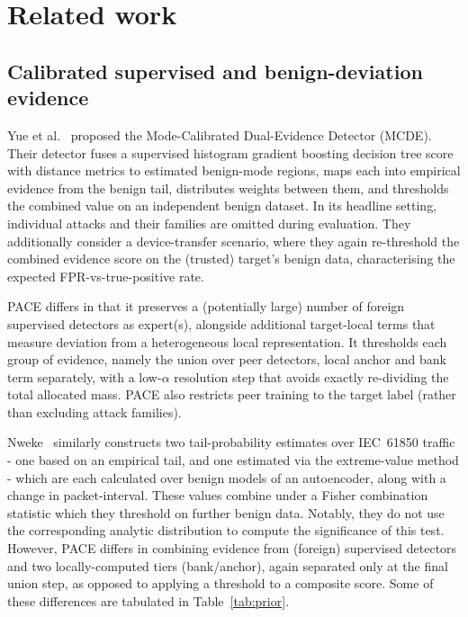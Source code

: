 \section{Related work} 
\label{sec:related} 
\subsection{Calibrated supervised and benign-deviation evidence} 
Yue et al.~\cite{yue2026mcde} proposed the Mode-Calibrated Dual-Evidence Detector (MCDE). Their detector fuses a supervised histogram gradient boosting decision tree score with distance metrics to estimated benign-mode regions, maps each into empirical evidence from the benign tail, distributes weights between them, and thresholds the combined value on an independent benign dataset. In its headline setting, individual attacks and their families are omitted during evaluation. They additionally consider a device-transfer scenario, where they again re-threshold the combined evidence score on the (trusted) target's benign data, characterising the expected FPR-vs-true-positive rate.

PACE differs in that it preserves a (potentially large) number of foreign supervised detectors as expert(s), alongside additional target-local terms that measure deviation from a heterogeneous local representation. It thresholds each group of evidence, namely the union over peer detectors, local anchor and bank term separately, with a low-$\alpha$ resolution step that avoids exactly re-dividing the total allocated mass. PACE also restricts peer training to the target label (rather than excluding attack families).

Nweke~\cite{nweke2026tail} similarly constructs two tail-probability estimates over IEC~61850 traffic - one based on an empirical tail, and one estimated via the extreme-value method - which are each calculated over benign models of an autoencoder, along with a change in packet-interval. These values combine under a Fisher combination statistic which they threshold on further benign data. Notably, they do not use the corresponding analytic distribution to compute the significance of this test. However, PACE differs in combining evidence from (foreign) supervised detectors and two locally-computed tiers (bank/anchor), again separated only at the final union step, as opposed to applying a threshold to a composite score. Some of these differences are tabulated in Table~\ref{tab:prior}.
 

